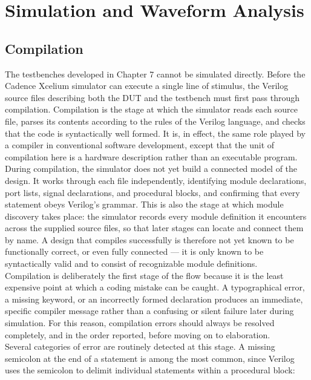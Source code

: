 \chapter{Simulation and Waveform Analysis}

\section{Compilation}

The testbenches developed in Chapter 7 cannot be simulated directly. Before the Cadence Xcelium simulator can execute a single line of stimulus, the Verilog source files describing both the DUT and the testbench must first pass through compilation. Compilation is the stage at which the simulator reads each source file, parses its contents according to the rules of the Verilog language, and checks that the code is syntactically well formed. It is, in effect, the same role played by a compiler in conventional software development, except that the unit of compilation here is a hardware description rather than an executable program.\\

During compilation, the simulator does not yet build a connected model of the design. It works through each file independently, identifying module declarations, port lists, signal declarations, and procedural blocks, and confirming that every statement obeys Verilog's grammar. This is also the stage at which module discovery takes place: the simulator records every module definition it encounters across the supplied source files, so that later stages can locate and connect them by name. A design that compiles successfully is therefore not yet known to be functionally correct, or even fully connected --- it is only known to be syntactically valid and to consist of recognizable module definitions.\\

Compilation is deliberately the first stage of the flow because it is the least expensive point at which a coding mistake can be caught. A typographical error, a missing keyword, or an incorrectly formed declaration produces an immediate, specific compiler message rather than a confusing or silent failure later during simulation. For this reason, compilation errors should always be resolved completely, and in the order reported, before moving on to elaboration.\\

Several categories of error are routinely detected at this stage. A missing semicolon at the end of a statement is among the most common, since Verilog uses the semicolon to delimit individual statements within a procedural block:\\

